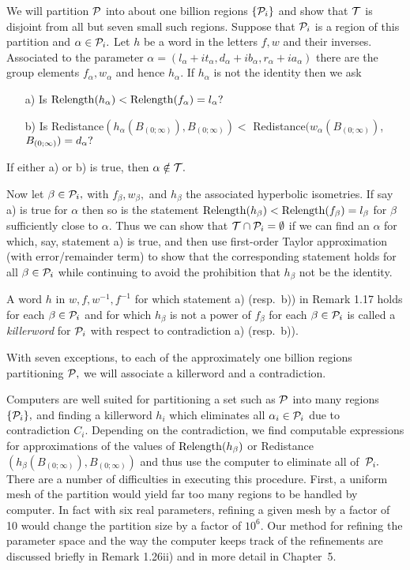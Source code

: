 We will partition ${\cal P}$ into about one billion regions
$\{{\cal P}_i\}$ and show that ${\cal T}$ is disjoint from all but seven small such regions.   Suppose that
${\cal P}_i$ is a region of this partition and $\alpha\in {\cal P}_i.$  Let $h$ be a word in the
letters $f,w$ and their inverses.  Associated to the parameter
$\alpha=(l_\alpha+it_\alpha, d_\alpha+ib_\alpha, r_\alpha
+ia_\alpha)$ there are the group elements
$f_\alpha, w_\alpha$ and hence $h_\alpha.$ 
If $h_\alpha$ is not the identity then we ask
\begin{itemize}
\item[a)]  Is ${\rm Relength} (h_\alpha) < {\rm Relength}(f_\alpha) = l_\alpha?$

\item[b)]  Is Redistance$(h_\alpha(B_{(0;\infty)}), B_{(0;\infty)}) < $ Redistance$(w_\alpha(B_{(0;\infty)})$, $B_{(0;\infty)})\break = d_\alpha?$
\end{itemize}
\noindent If either a) or b) is true, then $\alpha\notin {\cal T}.$

Now let $\beta\in {\cal P}_i,$
with $f_\beta, w_\beta,$ and $h_\beta$ the associated hyperbolic isometries.  If
say a) is true for $\alpha$
then so is the statement $\Relength(h_\beta) < \Relength(f_\beta)\break = l_\beta$ for
$\beta$ sufficiently close to $\alpha.$
Thus we can show that ${\cal T}\cap {\cal P}_i =\emptyset$ if we can find an $\alpha$ for
which, say, statement a) is true, and then
use first-order Taylor approximation (with error/remainder term) to show that the corresponding
statement holds for all $\beta\in {\cal P}_i $ while continuing to avoid the prohibition that $h_\beta$ not be the identity.
\enddemo

  A word $h$ in $w,f,w^{-1},f^{-1}$ for which statement a) (resp.\ b)) in Remark 1.17 holds for each $\beta\in {\cal P}_i$
and for which $h_\beta$ is not a power of $f_\beta$ for each $\beta\in {\cal P}_i$ is
called a {\it killerword} for ${\cal P}_i$ with respect to contradiction a) (resp.\ b)).

  With seven exceptions,  to each of the approximately one
billion regions partitioning ${\cal P},$ we will
associate a killerword and a contradiction.  \enddemo 

  Computers are well suited for partitioning a set such as ${\cal P}$
into many regions $\{{\cal P}_i \},$ and finding a
killerword $h_i$ which eliminates all $\alpha_i \in {\cal P}_i $ due to contradiction $C_i.$
Depending on the contradiction, we find
computable expressions  for approximations of the values of
${\rm Relength}(h_\beta)$ or Redistance$(h_\beta(B_{(0;\infty)}), B_{(0;\infty)})$ and
thus use the computer to eliminate all of~${\cal P}_i .$ 
\enddemo
There are a number of difficulties in executing this procedure.  First, a uniform mesh of the partition would
yield far too many regions to be handled by computer.  In fact with six
real parameters, refining a
given mesh by a factor of 10 would change the partition size by a factor of
$10^6$.  Our method for refining the
parameter space  and the way the computer keeps
track of the refinements are discussed briefly in Remark 1.26ii) and in more detail in Chapter~5.

